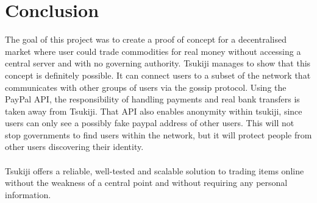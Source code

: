 \section{Conclusion}
The goal of this project was to create a proof of concept for a decentralised market where user could trade commodities for real money without accessing a central server and with no governing authority.
Tsukiji manages to show that this concept is definitely possible. It can connect users to a subset of the network that communicates with other groups of users via the gossip protocol.
Using the PayPal API, the responsibility of handling payments and real bank transfers is taken away from Tsukiji.
That API also enables anonymity within tsukiji, since users can only see a possibly fake paypal address of other users.
This will not stop governments to find users within the network, but it will protect people from other users discovering their identity.\\
\\
Tsukiji offers a reliable, well-tested and scalable solution to trading items online without the weakness of a central point and without requiring any personal information.
